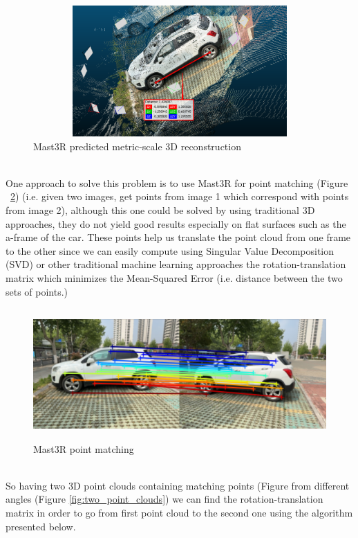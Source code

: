 \documentclass{article}
\begin{document}
\begin{figure}[!ht]
\includegraphics[width=12cm,height=5cm,keepaspectratio]{images/mast3r_pred.png}
\caption{Mast3R predicted metric-scale 3D reconstruction}
\label{fig:mast3r_prediction}
\end{figure}\\
\tab \tab One approach to solve this problem is to use Mast3R for point matching (Figure ~\ref{fig:mast3r_point_matching}) (i.e. given two images, get points from image 1 which correspond with points from image 2), although this one could be solved by using traditional 3D approaches, they do not yield good results especially on flat surfaces such as the a-frame of the car. These points help us translate the point cloud from one frame to the other since we can easily compute using Singular Value Decomposition (SVD) or other traditional machine learning approaches the rotation-translation matrix which minimizes the Mean-Squared Error (i.e. distance between the two sets of points.)
\begin{figure}[!ht]
\includegraphics[width=12cm,height=5cm,keepaspectratio]{images/matching_1_2.png}
\caption{Mast3R point matching}
\label{fig:mast3r_point_matching}
\end{figure}\\
\tab \tab So having two 3D point clouds containing matching points (Figure  from different angles (Figure \ref{fig:two_point_clouds}) we can find the rotation-translation matrix in order to go from first point cloud to the second one using the algorithm presented below.\\
\end{document}
